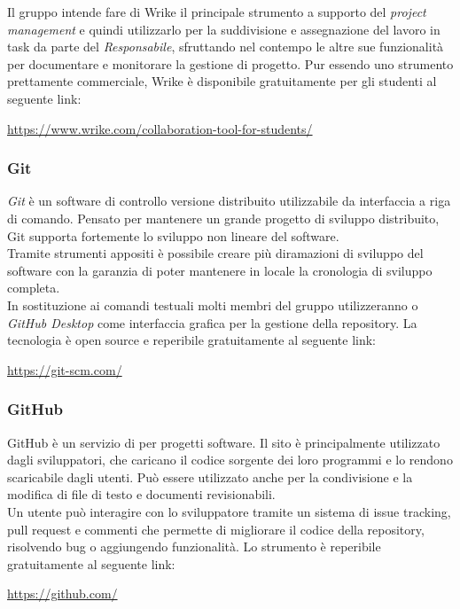 \documentclass[../NormediProgetto.tex]{subfiles}
\begin{document}
	Il gruppo intende fare di Wrike il principale strumento a supporto del \textit{project management} e quindi utilizzarlo per la suddivisione e assegnazione del lavoro in task da parte del \textit{Responsabile}, sfruttando nel contempo le altre sue funzionalità per documentare e monitorare la gestione di progetto. Pur essendo uno strumento prettamente commerciale, Wrike è disponibile gratuitamente per gli studenti al seguente link:
	\begin{center}
		\url{https://www.wrike.com/collaboration-tool-for-students/}
	\end{center}
	
	\subsubsection{Git}
	
	\textit{Git} è un software di controllo versione distribuito utilizzabile da interfaccia a riga di comando. Pensato per mantenere un grande progetto di sviluppo distribuito, Git supporta fortemente lo sviluppo non lineare del software.
	\\ \noindent Tramite strumenti appositi è possibile creare più diramazioni di sviluppo del software con la garanzia di poter mantenere in locale la cronologia di sviluppo completa.
	\\ \noindent In sostituzione ai comandi testuali molti membri del gruppo utilizzeranno  o \textit{GitHub Desktop} come interfaccia grafica per la gestione della repository. La tecnologia è open source e reperibile gratuitamente al seguente link:
	\begin{center}
		\url{https://git-scm.com/}
	\end{center}
	
	\subsubsection{GitHub}
	
	GitHub è un servizio di  per progetti software. Il sito è principalmente utilizzato dagli sviluppatori, che caricano il codice sorgente dei loro programmi e lo rendono scaricabile dagli utenti. Può essere utilizzato anche per la condivisione e la modifica di file di testo e documenti revisionabili.
	\\ \noindent Un utente può interagire con lo sviluppatore tramite un sistema di issue tracking, pull request e commenti che permette di migliorare il codice della repository, risolvendo bug o aggiungendo funzionalità. Lo strumento è reperibile gratuitamente al seguente link:
	\begin{center}
		\url{https://github.com/}
	\end{center}
	
\end{document}
